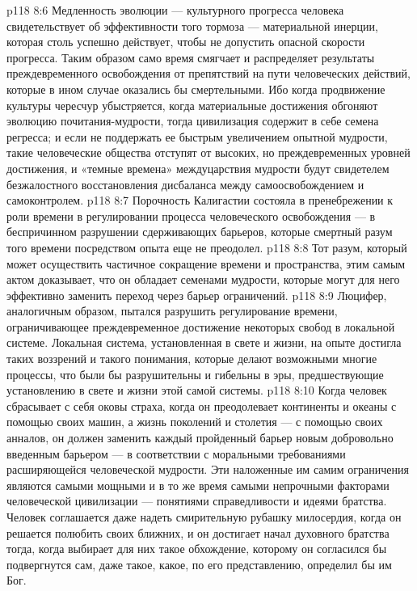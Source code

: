 \vs p118 8:6 Медленность эволюции --- культурного прогресса человека свидетельствует об эффективности того тормоза --- материальной инерции, которая столь успешно действует, чтобы не допустить опасной скорости прогресса. Таким образом само время смягчает и распределяет результаты преждевременного освобождения от препятствий на пути человеческих действий, которые в ином случае оказались бы смертельными. Ибо когда продвижение культуры чересчур убыстряется, когда материальные достижения обгоняют эволюцию почитания\hyp{}мудрости, тогда цивилизация содержит в себе семена регресса; и если не поддержать ее быстрым увеличением опытной мудрости, такие человеческие общества отступят от высоких, но преждевременных уровней достижения, и «темные времена» междуцарствия мудрости будут свидетелем безжалостного восстановления дисбаланса между самоосвобождением и самоконтролем.
\vs p118 8:7 Порочность Калигастии состояла в пренебрежении к роли времени в регулировании процесса человеческого освобождения --- в беспричинном разрушении сдерживающих барьеров, которые смертный разум того времени посредством опыта еще не преодолел.
\vs p118 8:8 Тот разум, который может осуществить частичное сокращение времени и пространства, этим самым актом доказывает, что он обладает семенами мудрости, которые могут для него эффективно заменить переход через барьер ограничений.
\vs p118 8:9 Люцифер, аналогичным образом, пытался разрушить регулирование времени, ограничивающее преждевременное достижение некоторых свобод в локальной системе. Локальная система, установленная в свете и жизни, на опыте достигла таких воззрений и такого понимания, которые делают возможными многие процессы, что были бы разрушительны и гибельны в эры, предшествующие установлению в свете и жизни этой самой системы.
\vs p118 8:10 Когда человек сбрасывает с себя оковы страха, когда он преодолевает континенты и океаны с помощью своих машин, а жизнь поколений и столетия --- с помощью своих анналов, он должен заменить каждый пройденный барьер новым добровольно введенным барьером --- в соответствии с моральными требованиями расширяющейся человеческой мудрости. Эти наложенные им самим ограничения являются самыми мощными и в то же время самыми непрочными факторами человеческой цивилизации --- понятиями справедливости и идеями братства. Человек соглашается даже надеть смирительную рубашку милосердия, когда он решается полюбить своих ближних, и он достигает начал духовного братства тогда, когда выбирает для них такое обхождение, которому он согласился бы подвергнутся сам, даже такое, какое, по его представлению, определил бы им Бог.

